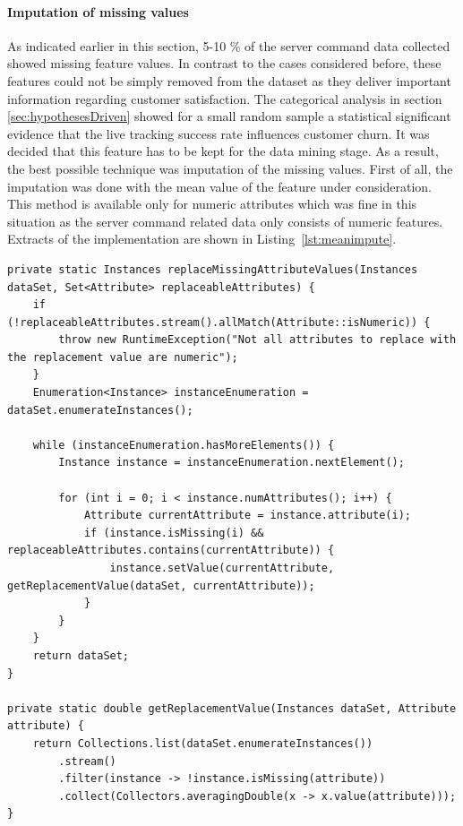 \paragraph{Imputation of missing values}
As indicated earlier in this section, 5-10 \% of the server command data collected showed missing feature values. In contrast to the cases considered before, these features could not be simply removed from the dataset as they deliver important information regarding customer satisfaction. The categorical analysis in section \ref{sec:hypothesesDriven} showed for a small random sample a statistical significant evidence that the live tracking success rate influences customer churn. It was decided that this feature has to be kept for the data mining stage. As a result, the best possible technique was imputation of the missing values. First of all, the imputation was done with the mean value of the feature under consideration. This method is available only for numeric attributes which was fine in this situation as the server command related data only consists of numeric features. Extracts of the implementation are shown in Listing~\ref{lst:meanimpute}.

\begin{lstlisting}[caption={Mean and mode imputation of missing values}, label={lst:meanimpute}]
private static Instances replaceMissingAttributeValues(Instances dataSet, Set<Attribute> replaceableAttributes) {
	if (!replaceableAttributes.stream().allMatch(Attribute::isNumeric)) {
		throw new RuntimeException("Not all attributes to replace with the replacement value are numeric");
	}
	Enumeration<Instance> instanceEnumeration = dataSet.enumerateInstances();
	
	while (instanceEnumeration.hasMoreElements()) {
		Instance instance = instanceEnumeration.nextElement();
		
		for (int i = 0; i < instance.numAttributes(); i++) {
			Attribute currentAttribute = instance.attribute(i);
			if (instance.isMissing(i) && replaceableAttributes.contains(currentAttribute)) {
				instance.setValue(currentAttribute, getReplacementValue(dataSet, currentAttribute));
			}
		}
	}
	return dataSet;
}

private static double getReplacementValue(Instances dataSet, Attribute attribute) {
	return Collections.list(dataSet.enumerateInstances())
		.stream()
		.filter(instance -> !instance.isMissing(attribute))
		.collect(Collectors.averagingDouble(x -> x.value(attribute)));
}
\end{lstlisting}

